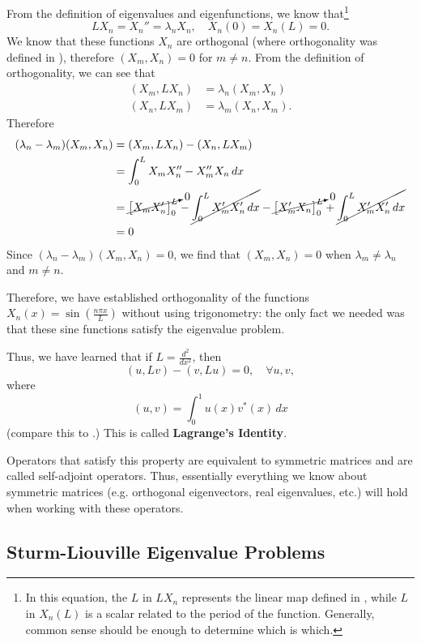\begin{enumerate}
	From the definition of eigenvalues and eigenfunctions, we know that\footnote{In this equation, the $L$ in $LX_n$ represents the linear map defined in , while $L$ in $X_n(L)$ is a scalar related to the period of the function. Generally, common sense should be enough to determine which is which.}
	\[
	LX_n = X_n'' = \lambda_n X_n, \quad X_n(0) = X_n(L) = 0.
	\]
	We know that these functions $X_n$ are orthogonal (where orthogonality was defined in ), therefore $(X_m, X_n) = 0$ for $m \neq n$. From the definition of orthogonality, we can see that
	\begin{align*}
		(X_m, LX_n) &= \lambda_n (X_m, X_n) \\
		(X_n, LX_m) &= \lambda_m (X_n, X_m).
	\end{align*}
	Therefore
	\begin{align*}
		(\lambda_n - \lambda_m)(X_m, X_n) &= (X_m, LX_n) - (X_n, LX_m) \\
		&= \int_0^L X_mX_n'' - X_m''X_n\,dx \\
		&= \cancelto{0}{\left[X_mX_n'\right]_0^L} - \cancel{\int_0^LX_m'X_n' \,dx} - \cancelto{0}{\left[X_m'X_n\right]_0^L} + \cancel{\int_0^L X_m'X_n' \,dx} \\
		&= 0
	\end{align*}
	Since $(\lambda_n - \lambda_m)(X_m, X_n) = 0$, we find that $(X_m,X_n) = 0$ when $\lambda_m \neq \lambda_n$ and $m \neq n$.
	
	Therefore, we have established orthogonality of the functions $X_n(x) = \sin\left(\frac{n\pi x}{L}\right)$ without using trigonometry: the only fact we needed was that these sine functions satisfy the eigenvalue problem.
\end{enumerate}

Thus, we have learned that if $L = \frac{d^2}{dx^2}$, then
\begin{equation}
	(u, Lv) - (v, Lu) = 0, \quad \forall u,v,
\end{equation}
where
\[
(u,v) = \int_0^1 u(x)v^*(x) \,dx
\]
(compare this to .) This is called \textbf{Lagrange's Identity}.

Operators that satisfy this property are equivalent to symmetric matrices and are called self-adjoint operators. Thus, essentially everything we know about symmetric matrices (e.g. orthogonal eigenvectors, real eigenvalues, etc.) will hold when working with these operators.

\subsection{Sturm-Liouville Eigenvalue Problems}

